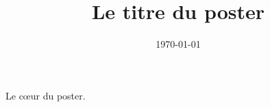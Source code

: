 \documentclass{beamer}
\title{Le titre du poster}
\date{\today}
\begin{document}
\begin{frame}[t,fragile]

Le c\oe ur du poster.

\end{frame}
\end{document}
